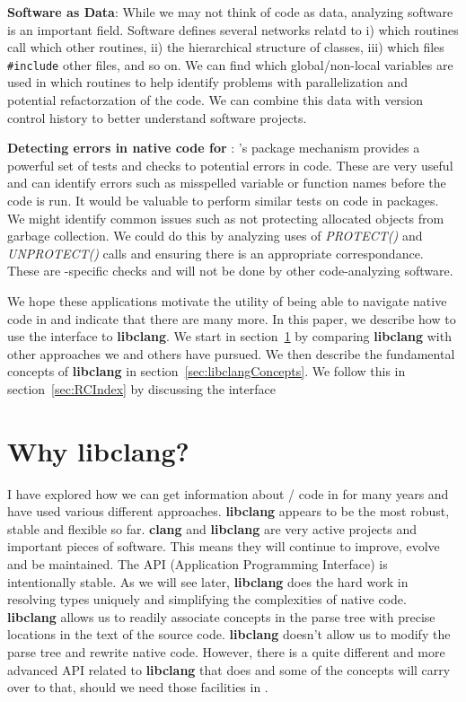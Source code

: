 \documentclass[article]{jss}
\def\C{\proglang{C}}
\def\Cpp{\proglang{C$++$}}
\def\R{\proglang{R}}
\def\Cfunc#1{\textit{#1()}}
\def\libclang{\textbf{libclang}}
\def\clang{\textbf{clang}}
\begin{document}
\textbf{Software as Data}: While we may not think of code as data,
analyzing software is an important field.  Software defines several
networks relatd to i) which routines call which other routines, ii)
the hierarchical structure of \Cpp{} classes, iii) which files
\texttt{\#include} other files, and so on.  We can find which
global/non-local variables are used in which routines to help identify
problems with parallelization and potential refactorzation of the
code.  We can combine this data with version control history to better
understand software projects.


\textbf{Detecting errors in native code for \R}: \R's package
mechanism provides a powerful set of tests and checks to potential
errors in \R{} code.  These are very useful and can identify errors
such as misspelled variable or function names before the code is run.
It would be valuable to perform similar tests on \C{} code in \R{}
packages.  We might identify common issues such as not protecting
allocated \R{} objects from garbage collection.  We could do this by
analyzing uses of \Cfunc{PROTECT} and \Cfunc{UNPROTECT} calls and
ensuring there is an appropriate correspondance.  These are
\R-specific checks and will not be done by other code-analyzing
software.

We hope these applications motivate the utility of being able to
navigate native code in \R and indicate that there are many more.  In
this paper, we describe how to use the \R{} interface to \libclang.
We start in section~\ref{sec:Whylibclang} by comparing \libclang{}
with other approaches we and others have pursued.  We then describe
the fundamental concepts of \libclang{} in
section~\ref{sec:libclangConcepts}.  We follow this in
section~\ref{sec:RCIndex} by discussing the \R{} interface


\section[Why libclang?]{Why \libclang?}\label{sec:Whylibclang}

I have explored how we can get information about \C/\Cpp{} code in
\R{} for many years and have used various different approaches.
\libclang{} appears to be the most robust, stable and flexible so far.
\clang{} and \libclang{} are very active projects and important pieces
of software. This means they will continue to improve, evolve and be
maintained.  The API (Application Programming Interface) is
intentionally stable.  As we will see later, \libclang{} does the hard
work in resolving types uniquely and simplifying the complexities of
native code.  \libclang{} allows us to readily associate concepts in
the parse tree with precise locations in the text of the source
code. \libclang{} doesn't allow us to modify the parse tree and
rewrite native code. However, there is a quite different and more
advanced API related to \libclang{} that does and some of the concepts
will carry over to that, should we need those facilities in \R.
\end{document}
